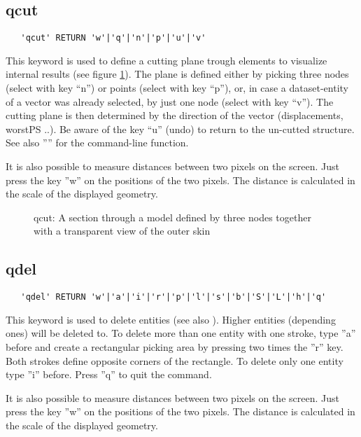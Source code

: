 \documentclass{article}
\begin{document}
\subsection{\label{qcut}qcut}
\begin{verbatim}
   'qcut' RETURN 'w'|'q'|'n'|'p'|'u'|'v'
\end{verbatim}
This keyword is used to define a cutting plane trough elements to visualize internal results (see figure \ref{qcutp}). The plane is defined either by picking three nodes (select with key ``n'') or points (select with key ``p''), or, in case a dataset-entity of a vector was already selected, by just one node (select with key ``v''). The cutting plane is then determined by the direction of the vector (displacements, worstPS ..). Be aware of the key ``u'' (undo) to return to the un-cutted structure. See also '''' for the command-line function.
 
It is also possible to measure distances between two pixels on the screen. Just press the key ''w'' on the positions of the two pixels. The distance is calculated in the scale of the displayed geometry.
  
\begin{figure}[h]
\caption{\label{qcutp}qcut: A section through a model defined by three nodes together with a transparent view of the outer skin}
\end{figure}

\subsection{\label{qdel}qdel}
\begin{verbatim}
   'qdel' RETURN 'w'|'a'|'i'|'r'|'p'|'l'|'s'|'b'|'S'|'L'|'h'|'q' 
\end{verbatim}
This keyword is used to delete entities (see also ). Higher entities (depending ones) will be deleted to. To delete more than one entity with one stroke, type ''a'' before and create a rectangular picking area by pressing two times the ''r'' key. Both strokes define opposite corners of the rectangle. To delete only one entity type ''i'' before. Press ''q'' to quit the command. 

It is also possible to measure distances between two pixels on the screen. Just press the key ''w'' on the positions of the two pixels. The distance is calculated in the scale of the displayed geometry.
\end{document}
